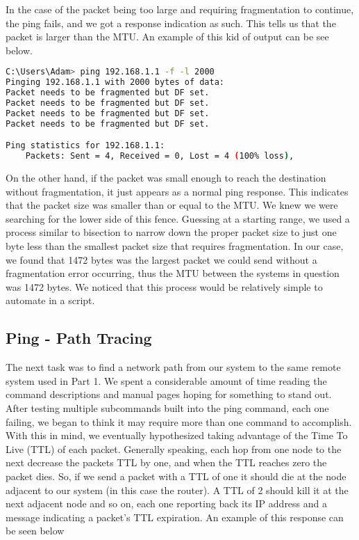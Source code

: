 \documentclass[prb,preprint]{revtex4-1}
\begin{document}
In the case of the packet being too large and requiring fragmentation to continue, the ping fails, and we got a response indication as such. This tells us that the packet is larger than the MTU. An example of this kid of output can be see below.
\vspace{5mm}

\begin{lstlisting}[language=bash]
C:\Users\Adam> ping 192.168.1.1 -f -l 2000                                                              
Pinging 192.168.1.1 with 2000 bytes of data:
Packet needs to be fragmented but DF set.
Packet needs to be fragmented but DF set.
Packet needs to be fragmented but DF set.
Packet needs to be fragmented but DF set.

Ping statistics for 192.168.1.1:
    Packets: Sent = 4, Received = 0, Lost = 4 (100% loss),
\end{lstlisting}

\vspace{5mm}

On the other hand, if the packet was small enough to reach the destination without fragmentation, it just appears as a normal ping response. This indicates that the packet size was smaller than or equal to the MTU. We knew we were searching for the lower side of this fence. Guessing at a starting range, we used a process similar to bisection to narrow down the proper packet size  to just one byte less than the smallest packet size that requires fragmentation. In our case, we found that 1472 bytes was the largest packet we could send without a fragmentation error occurring, thus the MTU between the systems in question was 1472 bytes. We noticed that this process would be relatively simple to automate in a script.


\subsection{Ping - Path Tracing}
The next task was to find a network path from our system to the same remote system used in Part 1. We spent a considerable amount of time reading the command descriptions and manual pages hoping for something to stand out. After testing multiple subcommands built into the ping command, each one failing, we began to think it may require more than one command to accomplish. With this in mind, we eventually hypothesized taking advantage of the Time To Live (TTL) of each packet. Generally speaking, each hop from one node to the next decrease the packets TTL by one, and when the TTL reaches zero the packet dies. So, if we send a packet with a TTL of one it should die at the node adjacent to our system (in this case the router). A TTL of 2 should kill it at the next adjacent node and so on, each one reporting back its IP address and a message indicating a packet's TTL expiration. An example of this response can be seen below
\end{document}
